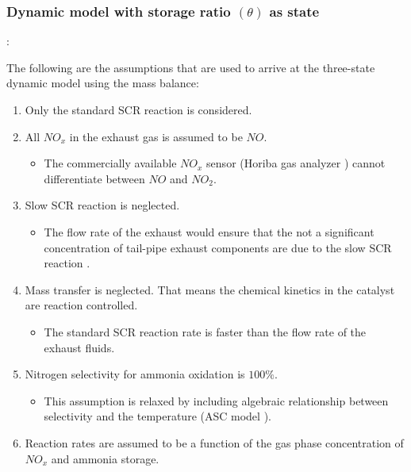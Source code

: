 
\subsubsection{Dynamic model with storage ratio $(\theta)$ as state}

:

The following are the assumptions that are used to arrive at the three-state
dynamic model using the mass balance\cite{devarakonda2009model}:
\begin{enumerate}
    \item Only the standard SCR reaction is considered.
    \item All $NO_x$ in the exhaust gas is assumed to be $NO$.
    \begin{itemize}
        \item The commercially available $NO_x$ sensor (Horiba gas analyzer \cite{nova2014urea}) cannot differentiate between $NO$ and $NO_2$.
    \end{itemize}
    \item Slow SCR reaction is neglected.
    \begin{itemize}
        \item The flow rate of the exhaust would ensure that the not a significant concentration of tail-pipe exhaust components are due to the slow SCR reaction \cite{nova2014urea}.
    \end{itemize}
    \item Mass transfer is neglected. That means the chemical kinetics in the catalyst are reaction controlled.
    \begin{itemize}
        \item The standard SCR reaction rate is faster than the flow rate of the exhaust fluids.
    \end{itemize}
    \item Nitrogen selectivity for ammonia oxidation is $100\%$.
    \begin{itemize}
        \item This assumption is relaxed by including algebraic relationship between selectivity and the temperature (ASC model \cite{jain2023diagnostics}).
    \end{itemize}
    \item Reaction rates are assumed to be a function of the gas phase concentration of $NO_x$ and ammonia storage.
\end{enumerate}


